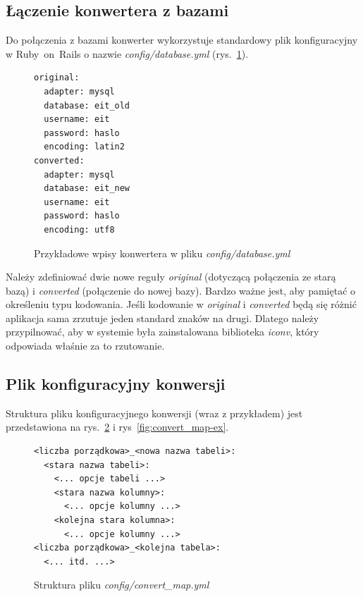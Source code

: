 \documentclass[a4paper,12pt,oneside]{report}
\begin{document}
\subsection{Łączenie konwertera z bazami}
\label{sub:convert-base}
Do połączenia z bazami konwerter wykorzystuje standardowy plik konfiguracyjny w Ruby~on~Rails o nazwie \emph{config/database.yml} (rys.~\ref{fig:database-yml}). 
\begin{figure}[h]
\centering
\begin{verbatim}original:
  adapter: mysql
  database: eit_old
  username: eit
  password: haslo
  encoding: latin2
converted:
  adapter: mysql
  database: eit_new
  username: eit
  password: haslo
  encoding: utf8\end{verbatim}
\caption{Przykładowe wpisy konwertera w pliku \emph{config/database.yml}\label{fig:database-yml}}
\end{figure}
Należy zdefiniować dwie nowe reguły \emph{original} (dotyczącą połączenia ze starą bazą) i \emph{converted} (połączenie do nowej bazy). Bardzo ważne jest, aby pamiętać o określeniu typu kodowania. Jeśli kodowanie w \emph{original} i \emph{converted} będą się różnić aplikacja sama zrzutuje jeden standard znaków na drugi. Dlatego należy przypilnować, aby w systemie była zainstalowana biblioteka \emph{iconv}, który odpowiada właśnie za to rzutowanie.

\subsection{Plik konfiguracyjny konwersji}
\label{sub:convert-conf}

Struktura pliku konfiguracyjnego konwersji (wraz z przykładem) jest przedstawiona na rys.~\ref{fig:convert_map} i rys~\ref{fig:convert_map-ex}.
\begin{figure}[h]
\centering
\begin{verbatim}<liczba porządkowa>_<nowa nazwa tabeli>:
  <stara nazwa tabeli>:
    <... opcje tabeli ...>
    <stara nazwa kolumny>:
      <... opcje kolumny ...>
    <kolejna stara kolumna>:
      <... opcje kolumny ...>
<liczba porządkowa>_<kolejna tabela>:
  <... itd. ...>\end{verbatim}
\caption{Struktura pliku \emph{config/convert\_map.yml}\label{fig:convert_map}}
\end{figure}
\end{document}
